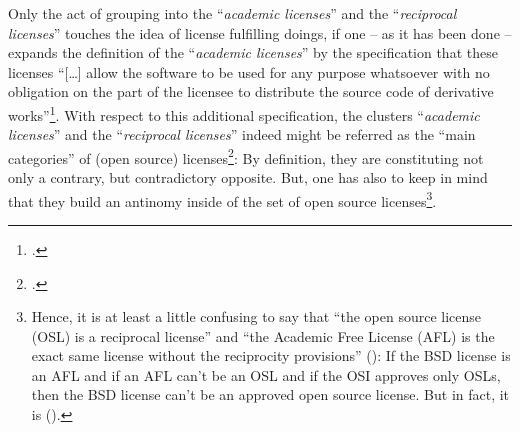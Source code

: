 Only the act of grouping into the \enquote{\emph{academic licenses}} and the
\enquote{\emph{reciprocal licenses}} touches the idea of license fulfilling
doings, if one -- as it has been done -- expands the definition of the
\enquote{\emph{academic licenses}} by the specification that these licenses
\enquote{[\ldots] allow the software to be used for any purpose whatsoever with
no obligation on the part of the licensee to distribute the source code of
derivative works}\footcite[cf.][71]{Rosen2005a}. With respect to this additional
specification, the clusters \enquote{\emph{academic licenses}} and the
\enquote{\emph{reciprocal licenses}} indeed might be referred as the
\enquote{main categories} of (open source)
licenses\footcite[cf.][179]{Rosen2005a}: By definition, they are constituting
not only a contrary, but contradictory opposite. But, one has also to keep in
mind that they build an antinomy inside of the set of open source
licenses\footnote{Hence, it is at least a little confusing to say that
\enquote{the open source license (OSL) is a reciprocal license} and \enquote{the
Academic Free License (AFL) is the exact same license without the reciprocity
provisions} (\cite[cf.][180]{Rosen2005a}): If the BSD license is an AFL and if
an AFL can't be an OSL and if the OSI approves only OSLs, then the BSD license
can't be an approved open source license. But in fact, it is (\cite[cf.][\nopage
wp]{OSI2012b}).}.

